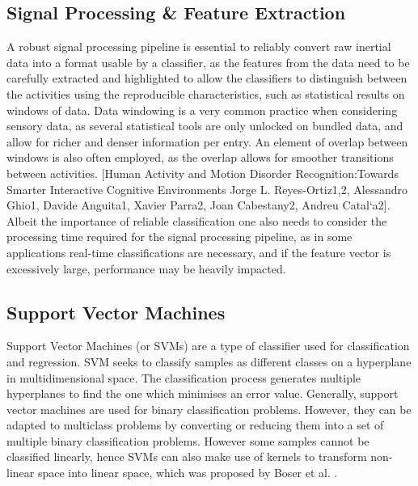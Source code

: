 \subsection{Signal Processing \& Feature Extraction}
A robust signal processing pipeline is essential to reliably convert raw inertial data into a format usable by a classifier, as the features from the data need to be carefully extracted and highlighted to allow the classifiers to distinguish between the activities using the reproducible characteristics, such as statistical results on windows of data. 
Data windowing is a very common practice when considering sensory data, as several statistical tools are only unlocked on bundled data, and allow for richer and denser information per entry. An element of overlap between windows is also often employed, as the overlap allows for smoother transitions between activities. [Human Activity and Motion Disorder Recognition:Towards Smarter Interactive Cognitive Environments Jorge L. Reyes-Ortiz1,2, Alessandro Ghio1, Davide Anguita1, Xavier Parra2, Joan Cabestany2, Andreu Catal`a2].
Albeit the importance of reliable classification one also needs to consider the processing time required for the signal processing pipeline, as in some applications real-time classifications are necessary, and if the feature vector is excessively large, performance may be heavily impacted. 



\subsection{Support Vector Machines}
    Support Vector Machines (or SVMs) are a type of classifier used for classification and regression. SVM seeks to classify samples as different classes
    on a hyperplane in multidimensional space. The classification process generates multiple hyperplanes to find the one which minimises an error value.
    Generally, support vector machines are used for binary classification problems. However, they can be adapted to multiclass problems by converting
    or reducing them into a set of multiple binary classification problems. However some samples cannot be classified linearly, hence SVMs can also make
    use of kernels to transform non-linear space into linear space, which was proposed by Boser et al. \cite{Boser1992}.


